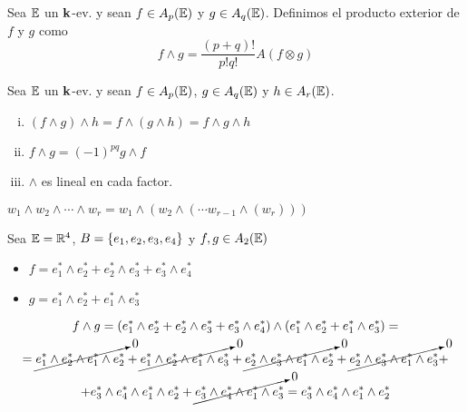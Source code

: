 \begin{defi}
	Sea $\mathbb{E}$ un $\mathbf{k}$-ev. y sean $f \in A_p(\mathbb{E})$ y $g \in A_q(\mathbb{E})$. Definimos el
	producto exterior de $f$ y $g$ como
	\[
		f \wedge g = \frac{(p+q)!}{p!q!}A(f \otimes g)
	\]
\end{defi}
\begin{prop}
	Sea $\mathbb{E}$ un $\mathbf{k}$-ev. y sean $f \in A_p(\mathbb{E})$, $g \in A_q(\mathbb{E})$ y $h \in A_r(\mathbb{E})$.
	\begin{enumerate}[i)]
		\item $(f \wedge g) \wedge h = f \wedge (g \wedge h) = f \wedge g \wedge h$
		\item $f \wedge g = (-1)^{pq} g \wedge f$
		\item $\wedge$ es lineal en cada factor.
	\end{enumerate}
\end{prop}
\begin{obs}
	$w_1 \wedge w_2 \wedge \cdots \wedge w_r = w_1 \wedge (w_2 \wedge (
	\cdots w_{r-1} \wedge (w_r)))$
\end{obs}
\begin{example}
	Sea $\mathbb{E} = \mathbb{R} ^4$, $B = \left\{e_1,e_2,e_3,e_4\right\}$ y $f,g \in A_2(\mathbb{E})$
	\begin{itemize}
		\item $f = e_1^* \wedge e_2^* + e_2^* \wedge e_3^* + e_3^* \wedge e_4^*$
		\item $g = e_1^* \wedge e_2^* + e_1^* \wedge e_3^*$
	\end{itemize}
	\begin{gather*}
		f \wedge g = (e_1^* \wedge e_2^* + e_2^* \wedge e_3^* + e_3^* \wedge e_4^*)
		\wedge (e_1^* \wedge e_2^* + e_1^* \wedge e_3^*) = \\
		 = \cancelto{0}{e_1^* \wedge e_2^* \wedge e_1^* \wedge e_2^*} +
		 \cancelto{0}{e_1^* \wedge e_2^* \wedge e_1^* \wedge e_3^*} +
		 \cancelto{0}{e_2^* \wedge e_3^* \wedge e_1^* \wedge e_2^*} +
		 \cancelto{0}{e_2^* \wedge e_3^* \wedge e_1^* \wedge e_3^*} + \\
		 + e_3^* \wedge e_4^* \wedge e_1^* \wedge e_2^* +
		 \cancelto{0}{e_3^* \wedge e_4^* \wedge e_1^* \wedge e_3^*} =
		 e_3^* \wedge e_4^* \wedge e_1^* \wedge e_2^*
	\end{gather*}
\end{example}
